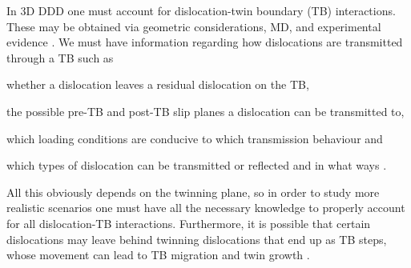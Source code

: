 In 3D DDD one must account for dislocation-twin boundary (TB) interactions. These may be obtained via geometric considerations, MD, and experimental evidence \cite{twinning2,twinning3,twinning4,twinning5}. We must have information regarding how dislocations are transmitted through a TB such as
\begin{inparaenum}[\itshape 1\upshape)]
	\item whether a dislocation leaves a residual dislocation on the TB,
	\item the possible pre-TB and post-TB slip planes a dislocation can be transmitted to,
	\item which loading conditions are conducive to which transmission behaviour and
	\item which types of dislocation can be transmitted or reflected and in what ways \cite{twinning}.
\end{inparaenum}
All this obviously depends on the twinning plane, so in order to study more realistic scenarios one must have all the necessary knowledge to properly account for all dislocation-TB interactions. Furthermore, it is possible that certain dislocations may leave behind twinning dislocations that end up as TB steps, whose movement can lead to TB migration and twin growth \cite{twinning6, twinning7}.

